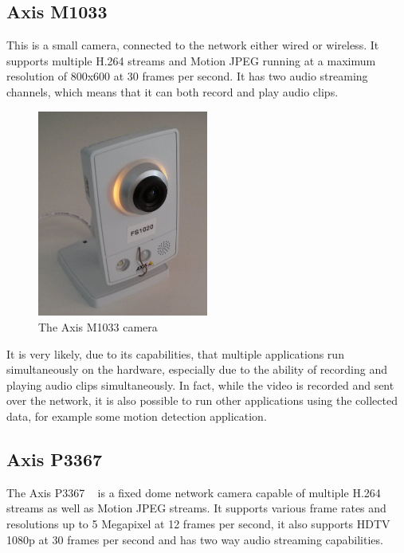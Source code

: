 \documentclass[nobiblatex]{LTHthesis}
\newcommand{\fixed}[1]%
  {\todo[inline,color=blue!30,caption={}]{\textbf{Fixed:} #1}}
\begin{document}
\subsection{Axis M1033}

This is a small camera, connected to the network either wired or wireless. 
It supports multiple H.264 streams and Motion JPEG running at a maximum
resolution of 800x600 at 30 frames per second. It has two audio streaming
channels, which means that it can both record and play audio clips. ~\cite{m1033} 

\begin{figure}[h]
    \centering
    \includegraphics[width=0.5\textwidth]{m1033}
    \caption{The Axis M1033 camera}
    \label{fig:M1033}
\end{figure}

It is very likely, due to its capabilities, that multiple applications run
simultaneously on the hardware, especially due to the ability of recording 
and playing audio clips simultaneously. In fact, while the video is recorded
and sent over the network, it is also possible to run other applications
using the collected data, for example some motion detection application.

\subsection{Axis P3367}

The Axis P3367 ~\cite{p3367} is a fixed dome network camera capable of multiple H.264
streams as well as Motion JPEG streams. It supports various frame rates and
resolutions up to 5 Megapixel at 12 frames per second, it also supports 
HDTV 1080p at 30 frames per second and has two way audio streaming 
capabilities.
\fixed{dome? home?}
\end{document}
